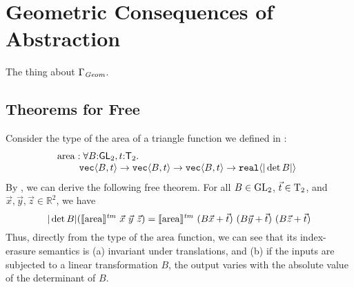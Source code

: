 \section{Geometric Consequences of Abstraction}
\label{sec:instantiations}


\begin{lemma}
  The thing about $\Gamma_{\mathit{Geom}}$.
\end{lemma}

\subsection{Theorems for Free}
\label{sec:theorems-for-free}

Consider the type of the area of a triangle function we defined in
:
\begin{displaymath}
  \begin{array}{@{}l}
    \mathrm{area} : \forall B\mathord:\SynGL{2}, t\mathord:\SynTransl{2}.\ \\
    \hspace{0.8cm}\tyPrim{vec}{B, t} \to \tyPrim{vec}{B, t} \to \tyPrim{vec}{B, t} \to \tyPrim{real}{|\det B|}
  \end{array}
\end{displaymath}
By , we can derive the following free theorem. For all $B \in \mathrm{GL}_2$, $\vec{t} \in \mathrm{T}_2$, and $\vec{x}, \vec{y}, \vec{z} \in \mathbb{R}^2$, we have 
\begin{displaymath}
  |\det B|(\tmSem{\mathrm{area}}\ \vec{x}\ \vec{y}\ \vec{z}) = \tmSem{\mathrm{area}}\ (B\vec{x} + \vec{t})\ (B\vec{y} + \vec{t})\ (B\vec{z} + \vec{t})
\end{displaymath}
Thus, directly from the type of the $\mathrm{area}$ function, we can
see that its index-erasure semantics is (a) invariant under
translations, and (b) if the inputs are subjected to a linear
transformation $B$, the output varies with the absolute value of the
determinant of $B$.




